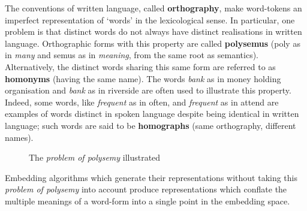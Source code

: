 The conventions of written language, called \textbf{orthography}, make word-tokens an imperfect representation of `words' in the lexicological sense. In particular, one problem is that distinct words do not always have distinct realisations in written language. Orthographic forms with this property are called \textbf{polysemus} (poly as in \emph{many} and semus as in \emph{meaning}, from the same root as semantics). Alternatively, the distinct words sharing this same form are referred to as \textbf{homonyms} (having the same name). The words \emph{bank} as in money holding organisation and \emph{bank} as in riverside are often used to illustrate this property. Indeed, some words, like \emph{frequent} as in often, and \emph{frequent} as in attend are examples of words distinct in spoken language despite being identical in written language; such words are said to be \textbf{homographs} (same orthography, different names).

\begin{figure}[h]
 \centering
 
 \caption{The \emph{problem of polysemy} illustrated}
\end{figure}

Embedding algorithms which generate their representations without taking this \emph{problem of polysemy} into account produce representations which conflate the multiple meanings of a word-form into a single point in the embedding space.

